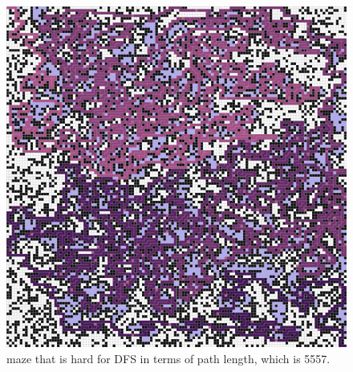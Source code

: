 \documentclass[letter]{article}
\begin{document}
\begin{enumerate}[resume]
\begin{enumerate}
\begin{enumerate}
\begin{figure}
					\includegraphics[width=\textwidth]{../pics/dp/5557.png}
					\caption{\label{fig:dp1}maze that is hard for DFS in terms of path length, which is 5557.}
					

\end{figure}
\end{enumerate}
\end{enumerate}
\end{enumerate}
\end{document}
